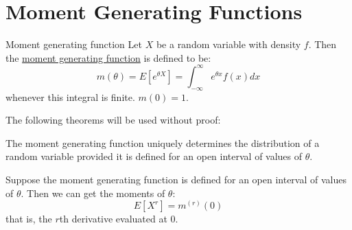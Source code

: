\documentclass[../Main.tex]{subfiles}
\begin{document}
\section{Moment Generating Functions}
\begin{definition}{Moment generating function}
    Let $X$ be a random variable with density $f$. Then the \underline{moment generating function} is defined to be:
    \begin{equation*}
        m(\theta) = E[e^{\theta X}] = \int_{-\infty}^\infty e^{\theta x} f(x) dx
    \end{equation*}
    whenever this integral is finite. $m(0) = 1$.
\end{definition}
The following theorems will be used without proof:
\begin{theorem}
    The moment generating function uniquely determines the distribution of a random variable provided it is defined for an open interval of values of $\theta$.
    \label{thmMGFDetermines}
\end{theorem}
\begin{theorem}
    Suppose the moment generating function is defined for an open interval of values of $\theta$. Then we can get the moments of $\theta$:
    \begin{equation*}
        E[X^r] = m^{(r)}(0)
    \end{equation*}
    that is, the $r$th derivative evaluated at 0.
\end{theorem}
\end{document}
